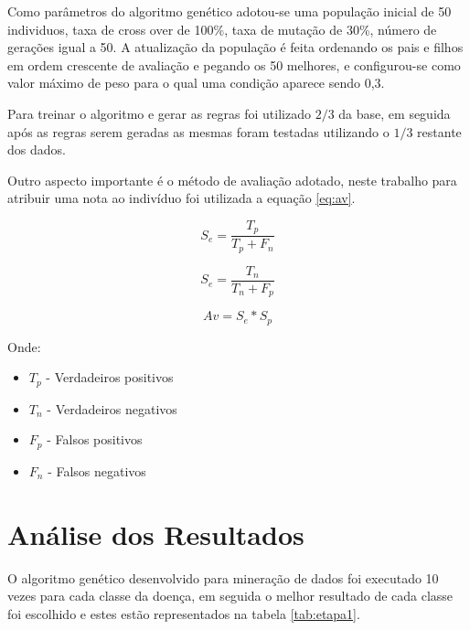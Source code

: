 \documentclass[11pt]{article}
\begin{document}
Como parâmetros do algoritmo genético adotou-se uma população inicial de
50 individuos, taxa de cross over de 100\%, taxa de mutação de 30\%, número de
gerações igual a 50. A atualização da população é feita ordenando os pais e
filhos em ordem crescente de avaliação e pegando os 50 melhores, e configurou-se
como valor máximo de peso para o qual uma condição aparece sendo 0,3.

Para treinar o algoritmo e gerar as regras foi utilizado $2/3$ da base, em seguida
após as regras serem geradas as mesmas foram testadas utilizando o $1/3$ restante
dos dados.

Outro aspecto importante é o método de avaliação adotado, neste trabalho
para atribuir uma nota ao indivíduo foi utilizada a equação \ref{eq:av}.

\begin{equation} \label{eq:se}
  S_e = \frac{T_p}{T_p +F_n}
\end{equation}

\begin{equation} \label{eq:sp}
  S_e = \frac{T_n}{T_n +F_p}
\end{equation}

\begin{equation} \label{eq:av}
  Av = S_e * S_p
\end{equation}

Onde:\newline
\begin{itemize}
    \item $T_p$ - Verdadeiros positivos\newline
    \item $T_n$ - Verdadeiros negativos\newline
    \item $F_p$ - Falsos positivos\newline
    \item $F_n$ - Falsos negativos\newline

\end{itemize}

\section{Análise dos Resultados}
\label{sec:resultados}

O algoritmo genético desenvolvido para mineração de dados foi executado 10 vezes
para cada classe da doença, em seguida o melhor resultado de cada classe foi
escolhido e estes estão representados na tabela \ref{tab:etapa1}.
\end{document}
